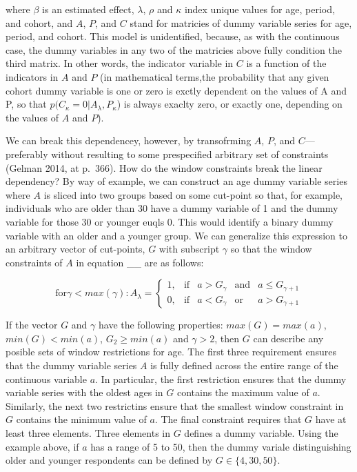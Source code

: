 \documentclass[]{article}
\begin{document}
where \(\beta\) is an estimated effect, \(\lambda\), \(\rho\) and
\(\kappa\) index unique values for age, period, and cohort, and \(A\),
\(P\), and \(C\) stand for matricies of dummy variable series for age,
period, and cohort. This model is unidentified, because, as with the
continuous case, the dummy variables in any two of the matricies above
fully condition the third matrix. In other words, the indicator variable
in \(C\) is a function of the indicators in \(A\) and \(P\) (in
mathematical terms,the probability that any given cohort dummy variable
is one or zero is exctly dependent on the values of A and P, so that
\(p(C_{\kappa}=0|A_{\lambda},P_{\kappa}\)) is always exaclty zero, or
exactly one, depending on the values of \(A\) and \(P\)).

We can break this dependencey, however, by transofrming \(A\), \(P\),
and \(C\)---preferably without resulting to some prespecified arbitrary
set of constraints (Gelman 2014, at p.~366). How do the window
constraints break the linear dependency? By way of example, we can
construct an age dummy variable series where \(A\) is sliced into two
groups based on some cut-point so that, for example, individuals who are
older than 30 have a dummy variable of 1 and the dummy variable for
those 30 or younger euqls 0. This would identify a binary dummy variable
with an older and a younger group. We can generalize this expression to
an arbitrary vector of cut-points, \(G\) with subscript \(\gamma\) so
that the window constraints of \(A\) in equation \_\_ are as follows:

\[
\mbox{for} \gamma < max(\gamma):
A_{\lambda}  =
\begin{cases}
  1, & \mbox{if} & a > G_{\gamma} & \mbox{and} & a \leq G_{\gamma+1} \\
  0, & \mbox{if} & a < G_{\gamma} & \mbox{or} & a > G_{\gamma+1}
\end{cases}
\]

If the vector \(G\) and \(\gamma\) have the following properties:
\(max(G) = max(a)\), \(min(G) < min(a)\), \(G_2 \geq min(a)\) and
\(\gamma>2\), then \(G\) can describe any posible sets of window
restrictions for age. The first three requirement ensures that the dummy
variable series \(A\) is fully defined across the entire range of the
continuous variable \(a\). In particular, the first restriction ensures
that the dummy variable series with the oldest ages in \(G\) contains
the maximum value of \(a\). Similarly, the next two restrictins ensure
that the smallest window constraint in \(G\) contains the minimum value
of \(a\). The final constraint requires that \(G\) have at least three
elements. Three elements in \(G\) defines a dummy variable. Using the
example above, if \(a\) has a range of 5 to 50, then the dummy variale
distinguishing older and younger respondents can be defined by
\(G \in \{4,30,50\}\).
\end{document}
